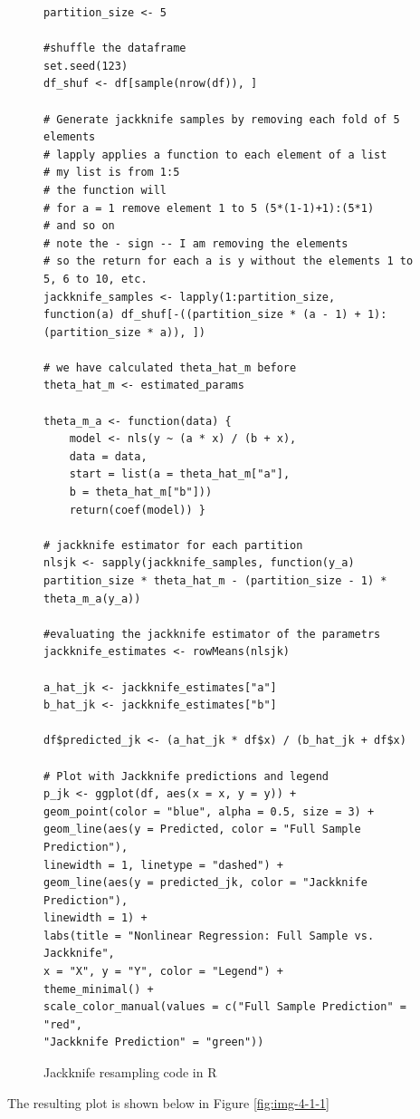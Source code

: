 \documentclass[]{article}
\begin{document}
\begin{figure}[H]
	\captionsetup{type=lstlisting}
	\begin{lstlisting}
partition_size <- 5

#shuffle the dataframe
set.seed(123)
df_shuf <- df[sample(nrow(df)), ]

# Generate jackknife samples by removing each fold of 5 elements
# lapply applies a function to each element of a list
# my list is from 1:5
# the function will
# for a = 1 remove element 1 to 5 (5*(1-1)+1):(5*1)
# and so on
# note the - sign -- I am removing the elements
# so the return for each a is y without the elements 1 to 5, 6 to 10, etc.
jackknife_samples <- lapply(1:partition_size,
function(a) df_shuf[-((partition_size * (a - 1) + 1):(partition_size * a)), ])

# we have calculated theta_hat_m before
theta_hat_m <- estimated_params

theta_m_a <- function(data) {
	model <- nls(y ~ (a * x) / (b + x),
	data = data,
	start = list(a = theta_hat_m["a"],
	b = theta_hat_m["b"]))
	return(coef(model)) }

# jackknife estimator for each partition
nlsjk <- sapply(jackknife_samples, function(y_a) partition_size * theta_hat_m - (partition_size - 1) * theta_m_a(y_a))

#evaluating the jackknife estimator of the parametrs
jackknife_estimates <- rowMeans(nlsjk)

a_hat_jk <- jackknife_estimates["a"]
b_hat_jk <- jackknife_estimates["b"]

df$predicted_jk <- (a_hat_jk * df$x) / (b_hat_jk + df$x)

# Plot with Jackknife predictions and legend
p_jk <- ggplot(df, aes(x = x, y = y)) +
geom_point(color = "blue", alpha = 0.5, size = 3) +
geom_line(aes(y = Predicted, color = "Full Sample Prediction"),
linewidth = 1, linetype = "dashed") +
geom_line(aes(y = predicted_jk, color = "Jackknife Prediction"),
linewidth = 1) +
labs(title = "Nonlinear Regression: Full Sample vs. Jackknife",
x = "X", y = "Y", color = "Legend") +
theme_minimal() +
scale_color_manual(values = c("Full Sample Prediction" = "red",
"Jackknife Prediction" = "green"))
	\end{lstlisting}
	\caption{Jackknife resampling code in R}
	\label{lst:jk}
\end{figure}

The resulting plot is shown below in Figure \ref{fig:img-4-1-1}
\end{document}
